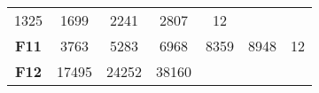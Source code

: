\documentclass[12pt,a4paper]{article}
\begin{document}
\begin{longtable}[c]{@{}ccccccc@{}}
\begin{minipage}[t]{0.08\columnwidth}\centering\strut
1325
\strut\end{minipage} &
\begin{minipage}[t]{0.09\columnwidth}\centering\strut
1699
\strut\end{minipage} &
\begin{minipage}[t]{0.10\columnwidth}\centering\strut
2241
\strut\end{minipage} &
\begin{minipage}[t]{0.11\columnwidth}\centering\strut
2807
\strut\end{minipage} &
\begin{minipage}[t]{0.07\columnwidth}\centering\strut
12
\strut\end{minipage}\tabularnewline
\begin{minipage}[t]{0.11\columnwidth}\centering\strut
\textbf{F11}
\strut\end{minipage} &
\begin{minipage}[t]{0.08\columnwidth}\centering\strut
3763
\strut\end{minipage} &
\begin{minipage}[t]{0.08\columnwidth}\centering\strut
5283
\strut\end{minipage} &
\begin{minipage}[t]{0.09\columnwidth}\centering\strut
6968
\strut\end{minipage} &
\begin{minipage}[t]{0.10\columnwidth}\centering\strut
8359
\strut\end{minipage} &
\begin{minipage}[t]{0.11\columnwidth}\centering\strut
8948
\strut\end{minipage} &
\begin{minipage}[t]{0.07\columnwidth}\centering\strut
12
\strut\end{minipage}\tabularnewline
\begin{minipage}[t]{0.11\columnwidth}\centering\strut
\textbf{F12}
\strut\end{minipage} &
\begin{minipage}[t]{0.08\columnwidth}\centering\strut
17495
\strut\end{minipage} &
\begin{minipage}[t]{0.08\columnwidth}\centering\strut
24252
\strut\end{minipage} &
\begin{minipage}[t]{0.09\columnwidth}\centering\strut
38160
\strut\end{minipage} &

\end{longtable}
\end{document}
